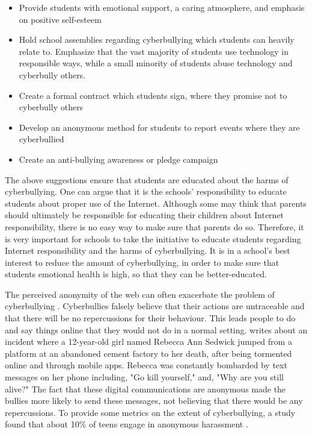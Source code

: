 \begin{itemize}
\item
Provide students with emotional support, a caring atmosphere, and emphasis on positive self-esteem
\item
Hold school assemblies regarding cyberbullying which students can heavily relate to. Emphasize that the vast majority of students use technology in responsible ways, while a small minority of students abuse technology and cyberbully others.
\item
Create a formal contract which students sign, where they promise not to cyberbully others
\item
Develop an anonymous method for students to report events where they are cyberbullied
\item
Create an anti-bullying awareness or pledge campaign
\end{itemize}

	The above suggestions ensure that students are educated about the harms of cyberbullying. One can argue that it is the schools' responsibility to educate students about proper use of the Internet. Although some may think that parents should ultimately be responsible for educating their children about Internet responsibility, there is no easy way to make sure that parents do so. Therefore, it is very important for schools to take the initiative to educate students regarding Internet responsibility and the harms of cyberbullying. It is in a school's best interest to reduce the amount of cyberbullying, in order to make sure that students emotional health is high, so that they can be better-educated.
    	
    The perceived anonymity of the web can often exacerbate the problem of cyberbullying \cite{anonymity}. Cyberbullies falsely believe that their actions are untraceable and that there will be no repercussions for their behaviour. This leads people to do and say things online that they would not do in a normal setting. \cite{taran} writes about an incident where a 12-year-old girl named Rebecca Ann Sedwick jumped from a platform at an abandoned cement factory to her death, after being tormented online and through mobile apps. Rebecca was constantly bombarded by text messages on her phone including, "Go kill yourself," and, "Why are you still alive?" The fact that these digital communications are anonymous made the bullies more likely to send these messages, not believing that there would be any repercussions. To provide some metrics on the extent of cyberbullying, a study found that about 10\% of teens engage in anonymous harassment \cite{collier}.
    
